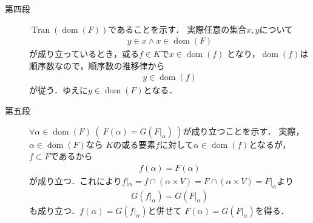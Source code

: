 \begin{prf}
\begin{description}
			\item[第四段] $\operatorname{Tran}(\operatorname{dom}(F))$であることを示す．
				実際任意の集合$x,y$について
				\begin{align}
					y \in x \wedge x \in \operatorname{dom}(F)
				\end{align}
				が成り立っているとき，或る$f \in K$で$x \in \operatorname{dom}(f)$
				となり，$\operatorname{dom}(f)$は順序数なので，順序数の推移律から
				\begin{align}
					y \in \operatorname{dom}(f)
				\end{align}
				が従う．ゆえに$y \in \operatorname{dom}(F)$となる．
				
			\item[第五段] $\forall \alpha \in \operatorname{dom}(F)\ (\ F(\alpha) = G(F|_\alpha)\ )$が成り立つことを示す．
				実際，$\alpha \in \operatorname*{dom}(F)$なら
				$K$の或る要素$f$に対して$\alpha \in \operatorname*{dom}(f)$となるが，
				$f \subset F$であるから
				\begin{align}
					f(\alpha) = F(\alpha)
				\end{align}
				が成り立つ．これにより$f|_\alpha = f \cap (\alpha \times V)
				= F \cap (\alpha \times V) = F|_\alpha$より
				\begin{align}
					G(f|_\alpha) = G(F|_\alpha)
				\end{align}
				も成り立つ．$f(\alpha) = G(f|_\alpha)$と併せて
				$F(\alpha) = G(F|_\alpha)$を得る．
			

\end{description}
\end{prf}
